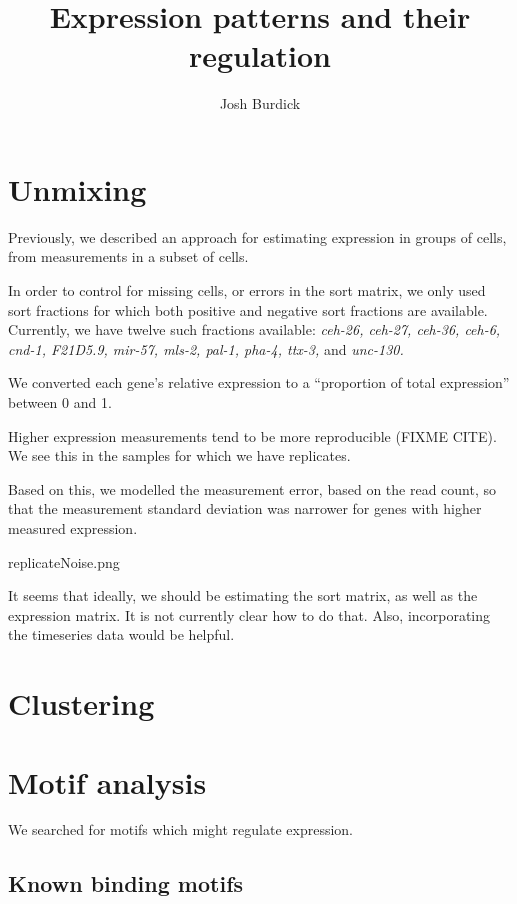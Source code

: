 \documentclass{article}
\begin{document}
\title{Expression patterns and their regulation}
\author{Josh Burdick}
\maketitle

\section*{Unmixing}

Previously, we described an approach for estimating expression in
groups of cells, from measurements in a subset of cells.

In order to control for missing cells, or errors in the sort matrix,
we only used sort fractions for which both positive and negative
sort fractions are available. Currently, we have twelve such fractions
available:
{\em ceh-26, ceh-27, ceh-36, ceh-6, cnd-1, F21D5.9, mir-57, mls-2, pal-1,
pha-4, ttx-3,} and {\em unc-130.}


We converted each gene's relative expression to a ``proportion of total
expression'' between 0 and 1.


Higher expression measurements tend to
be more reproducible (FIXME CITE). We see this in the samples for which
we have replicates.

Based on this, we modelled the measurement error, based on the read count,
so that the measurement standard deviation was
narrower for genes with higher measured
expression.


replicateNoise.png



It seems that ideally, we should be estimating the sort matrix, as well
as the expression matrix. It is not currently clear how to do that.
Also, incorporating the timeseries data would be helpful.


\section*{Clustering}






\section*{Motif analysis}

We searched for motifs which might regulate expression.


\subsection*{Known binding motifs}
\end{document}
